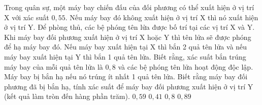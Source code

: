 

\begin{ex}%
	Trong quân sự, một máy bay chiến đấu của đối phương có thể xuất hiện ở vị trí X với xác suất $0{,}55$. Nếu máy bay đó không xuất hiện ở vị trí X thì nó xuất hiện ở vị trí Y. Để phòng thủ, các bệ phóng tên lửa được bố trí tại các vị trí X và Y. Khi máy bay đối phương xuất hiện ở vị trí X hoặc Y thì tên lửa sẽ được phóng để hạ máy bay đó. Nếu máy bay xuất hiện tại X thì bắn 2 quả tên lửa và nếu máy bay xuất hiện tại Y thì bắn 1 quả tên lửa. Biết rằng, xác suất bắn trúng  máy bay của mỗi quả tên lửa là $0{,}8$ và các bệ phóng tên lửa hoạt động độc lập. Máy bay bị bắn hạ nếu nó trúng ít nhất 1 quả tên lửa. Biết rằng máy bay đối phương đã bị bắn hạ, tính xác suất để máy bay đối phương xuất hiện ở vị trí Y (kết quả làm tròn đến hàng phần trăm).
	\choice 
		 {$0{,}59$}
		 {\True$0{,}41$}
		{$0{,}8$} 
		{$0{,}89$} 
\end{ex}

